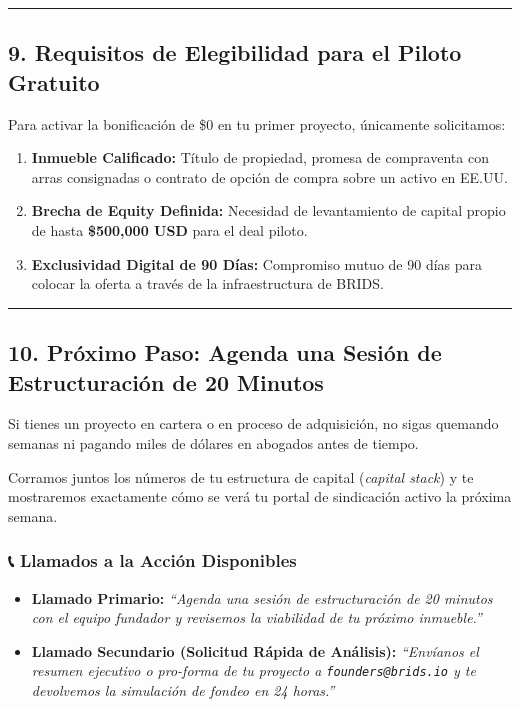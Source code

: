 \documentclass[
]{article}
\providecommand{\tightlist}{%
  \setlength{\itemsep}{0pt}\setlength{\parskip}{0pt}}
\renewenvironment{quote}{%
  \vspace{0.4em}
  \begin{tcolorbox}[
    colback=bridsLight,
    colframe=bridsBlue,
    arc=2mm,
    boxrule=1.2pt,
    left=10pt,
    right=10pt,
    top=8pt,
    bottom=8pt,
    before skip=6pt,
    after skip=8pt
  ]%
}{%
  \end{tcolorbox}%
}
\begin{document}
\begin{center}\rule{0.5\linewidth}{0.5pt}\end{center}

\subsection{9. Requisitos de Elegibilidad para el Piloto
Gratuito}\label{requisitos-de-elegibilidad-para-el-piloto-gratuito}

Para activar la bonificación de \$0 en tu primer proyecto, únicamente
solicitamos:

\begin{enumerate}
\def\labelenumi{\arabic{enumi}.}
\tightlist
\item
  \textbf{Inmueble Calificado:} Título de propiedad, promesa de
  compraventa con arras consignadas o contrato de opción de compra sobre
  un activo en EE.UU.
\item
  \textbf{Brecha de Equity Definida:} Necesidad de levantamiento de
  capital propio de hasta \textbf{\$500,000 USD} para el deal piloto.
\item
  \textbf{Exclusividad Digital de 90 Días:} Compromiso mutuo de 90 días
  para colocar la oferta a través de la infraestructura de BRIDS.
\end{enumerate}

\begin{center}\rule{0.5\linewidth}{0.5pt}\end{center}

\subsection{10. Próximo Paso: Agenda una Sesión de Estructuración de 20
Minutos}\label{pruxf3ximo-paso-agenda-una-sesiuxf3n-de-estructuraciuxf3n-de-20-minutos}

Si tienes un proyecto en cartera o en proceso de adquisición, no sigas
quemando semanas ni pagando miles de dólares en abogados antes de
tiempo.

Corramos juntos los números de tu estructura de capital (\emph{capital
stack}) y te mostraremos exactamente cómo se verá tu portal de
sindicación activo la próxima semana.

\begin{quote}
\mbox{}%
\subsubsection{📞 Llamados a la Acción
Disponibles}\label{llamados-a-la-acciuxf3n-disponibles}

\begin{itemize}
\tightlist
\item
  \textbf{Llamado Primario:} \emph{``Agenda una sesión de estructuración
  de 20 minutos con el equipo fundador y revisemos la viabilidad de tu
  próximo inmueble.''}
\item
  \textbf{Llamado Secundario (Solicitud Rápida de Análisis):}
  \emph{``Envíanos el resumen ejecutivo o pro-forma de tu proyecto a
  \texttt{founders@brids.io} y te devolvemos la simulación de fondeo en
  24 horas.''}
\end{itemize}
\end{quote}
\end{document}

